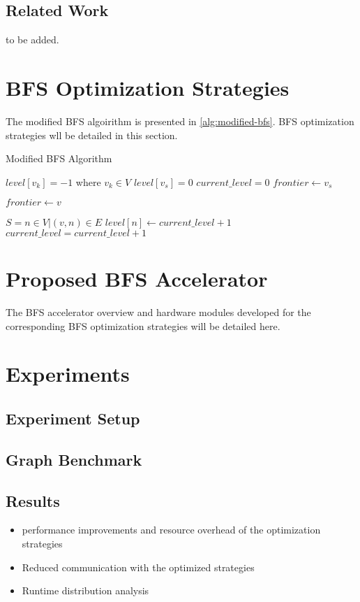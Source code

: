 \documentclass[12pt]{article} %
\begin{document}
\subsection{Related Work}
to be added.


\section{BFS Optimization Strategies}
The modified BFS algoirithm is presented in \ref{alg:modified-bfs}.
BFS optimization strategies wll be detailed in this section.
\begin{algorithm}
	\caption{Modified BFS Algorithm} \label{alg:modified-bfs}
	\begin{algorithmic}[1]
		\State $level[v_k] = -1$ where $v_k \in V$
		\State $level[v_s] = 0$
		\State $current\_level = 0$
		\State $frontier \gets v_s$


		\State $frontier \gets v$
		\EndIf
		\EndFor

		\State $S = {n \in V | (v, n) \in E}$
		\State $level[n] \gets current\_level + 1$
		\EndIf
		\EndFor
		\EndFor
		\State $current\_level = current\_level + 1$
		\EndWhile
		\EndProcedure
	\end{algorithmic}
\end{algorithm}


\section{Proposed BFS Accelerator}
The BFS accelerator overview and hardware modules  developed for the corresponding
BFS optimization strategies will be detailed here.

\section{Experiments}
\subsection{Experiment Setup}
\subsection{Graph Benchmark}
\subsection{Results}
\begin{itemize}
	\item performance improvements and resource overhead of the optimization strategies
	\item Reduced communication with the optimized strategies
	\item Runtime distribution analysis 
\end{itemize}
\end{document}
